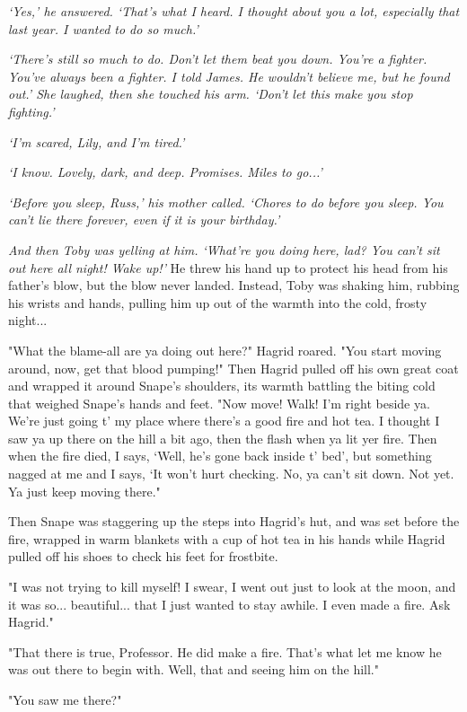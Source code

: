 \documentclass[a4paper,11pt]{article}
\begin{document}
\emph{`Yes,' he answered. `That's what I heard. I thought about you a lot, especially that last year. I wanted to do so much.'}

\emph{`There's still so much to do. Don't let them beat you down. You're a fighter. You've always been a fighter. I told James. He wouldn't believe me, but he found out.' She laughed, then she touched his arm. `Don't let this make you stop fighting.'}

\emph{`I'm scared, Lily, and I'm tired.'}

\emph{`I know. Lovely, dark, and deep. Promises. Miles to go...'}

\emph{`Before you sleep, Russ,' his mother called. `Chores to do before you sleep. You can't lie there forever, even if it is your birthday.'}

\emph{And then Toby was yelling at him. `What're you doing here, lad? You can't sit out here all night! Wake up!'} He threw his hand up to protect his head from his father's blow, but the blow never landed. Instead, Toby was shaking him, rubbing his wrists and hands, pulling him up out of the warmth into the cold, frosty night...

"What the blame-all are ya doing out here?" Hagrid roared. "You start moving around, now, get that blood pumping!" Then Hagrid pulled off his own great coat and wrapped it around Snape's shoulders, its warmth battling the biting cold that weighed Snape's hands and feet. "Now move! Walk! I'm right beside ya. We're just going t' my place where there's a good fire and hot tea. I thought I saw ya up there on the hill a bit ago, then the flash when ya lit yer fire. Then when the fire died, I says, `Well, he's gone back inside t' bed', but something nagged at me and I says, `It won't hurt checking. No, ya can't sit down. Not yet. Ya just keep moving there."

Then Snape was staggering up the steps into Hagrid's hut, and was set before the fire, wrapped in warm blankets with a cup of hot tea in his hands while Hagrid pulled off his shoes to check his feet for frostbite.

"I was not trying to kill myself! I swear, I went out just to look at the moon, and it was so... beautiful... that I just wanted to stay awhile. I even made a fire. Ask Hagrid."

"That there is true, Professor. He did make a fire. That's what let me know he was out there to begin with. Well, that and seeing him on the hill."

"You saw me there?"
\end{document}
